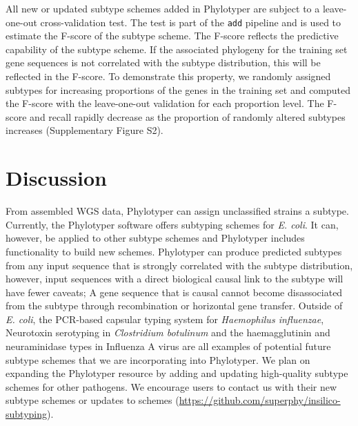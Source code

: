 \documentclass{bioinfo}
\begin{document}
All new or updated subtype schemes added in Phylotyper are subject to a leave-one-out cross-validation test.
The test is part of the \texttt{add} pipeline and is used to estimate the F-score of the subtype scheme. 
The F-score reflects the predictive capability of the subtype scheme. 
If the associated phylogeny for the training set gene sequences is not correlated with the subtype distribution, this will be reflected in the F-score. 
To demonstrate this property, we randomly assigned subtypes for increasing proportions of the genes in the training set and computed the F-score with the leave-one-out validation for each proportion level.
The F-score and recall rapidly decrease as the proportion of randomly altered subtypes increases (Supplementary Figure S2).

\section{Discussion}

From assembled WGS data, Phylotyper can assign unclassified strains a subtype.
Currently, the Phylotyper software offers subtyping schemes for \textit{E. coli}.
It can, however, be applied to other subtype schemes and Phylotyper includes functionality to build new schemes.
Phylotyper can produce predicted subtypes from any input sequence that is strongly correlated with the subtype distribution, however, input sequences with a direct biological causal link to the subtype will have fewer caveats; A gene sequence that is causal cannot become disassociated from the subtype through recombination or horizontal gene transfer.
Outside of \textit{E. coli}, the PCR-based capsular typing system for \textit{Haemophilus influenzae}, Neurotoxin serotyping in \textit{Clostridium botulinum} and the haemagglutinin and neuraminidase types in Influenza A virus are all examples of potential future subtype schemes that we are incorporating into Phylotyper.
We plan on expanding the Phylotyper resource by adding and updating high-quality subtype schemes for other pathogens.
We encourage users to contact us with their new subtype schemes or updates to schemes (\url{https://github.com/superphy/insilico-subtyping}).
\end{document}
